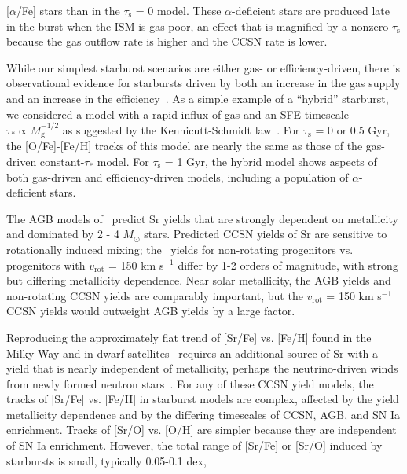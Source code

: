 [$\alpha$/Fe] stars than in the $\tau_\text{s}$ = 0 model. These 
$\alpha$-deficient stars are produced late in the burst when the ISM is 
gas-poor, an effect that is magnified by a nonzero $\tau_\text{s}$ because 
the gas outflow rate is higher and the CCSN rate is lower. 
\par 
While our simplest starburst scenarios are either gas- or efficiency-driven, 
there is observational evidence for starbursts driven by both 
an increase in the gas supply and an increase in the 
efficiency~\citep[][and the citations therein]{Kennicutt2012}. As a simple 
example of a ``hybrid'' starburst, we considered a model with a rapid influx 
of gas and an SFE timescale $\tau_* \propto M_\text{g}^{-1/2}$ as suggested 
by the Kennicutt-Schmidt law~\citep{Schmidt1959, Schmidt1963, Kennicutt1998}. 
For $\tau_\text{s}$ = 0 or 0.5 Gyr, the [O/Fe]-[Fe/H] tracks of this model are 
nearly the same as those of the gas-driven constant-$\tau_*$ model. For 
$\tau_\text{s}$ = 1 Gyr, the hybrid model shows aspects of both gas-driven and 
efficiency-driven models, including a population of $\alpha$-deficient stars. 
\par 
The AGB models of~\citet{Cristallo2011} predict Sr yields that are strongly 
dependent on metallicity and dominated by 2 - 4 $M_\odot$ stars. Predicted 
CCSN yields of Sr are sensitive to rotationally induced mixing; 
the~\citet{Limongi2018} yields for non-rotating progenitors vs. progenitors 
with $v_\text{rot}$ = 150 km s$^{-1}$ differ by 1-2 orders of magnitude, with 
strong but differing metallicity dependence. Near solar metallicity, the AGB 
yields and non-rotating CCSN yields are comparably important, but the 
$v_\text{rot}$ = 150 km s$^{-1}$ CCSN yields would outweight AGB yields by a 
large factor. 
\par 
Reproducing the approximately flat trend of [Sr/Fe] vs. [Fe/H] found in the 
Milky Way and in dwarf satellites~\citep{Mishenina2019, Hirai2019} requires 
an additional source of Sr with a yield that is nearly independent of 
metallicity, perhaps the neutrino-driven winds from newly formed neutron 
stars~\citep{Thompson2001, Vlasov2017, Thompson2018}. For any of these CCSN 
yield models, the tracks of [Sr/Fe] vs. [Fe/H] in starburst models are complex, 
affected by the yield metallicity dependence and by the differing timescales 
of CCSN, AGB, and SN Ia enrichment. Tracks of [Sr/O] vs. [O/H] are simpler 
because they are independent of SN Ia enrichment. However, the total range 
of [Sr/Fe] or [Sr/O] induced by starbursts is small, typically 0.05-0.1 dex, 
